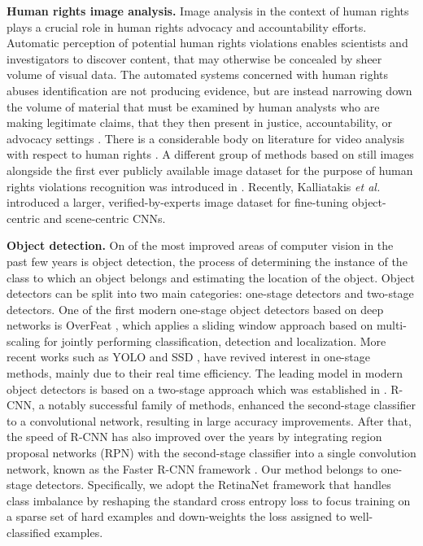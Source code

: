\documentclass[10pt,twocolumn,letterpaper]{article}
\begin{document}
\noindent
\textbf{Human rights image analysis.} Image analysis in the context of human rights plays a crucial role in human rights advocacy and accountability efforts. Automatic perception of potential human rights violations enables scientists and investigators to discover content, that may otherwise be concealed by sheer volume of visual data. The automated systems concerned with human rights abuses identification are not producing evidence, but are instead narrowing down the volume of material that must be examined by human analysts who are making legitimate claims, that they then present in justice, accountability, or advocacy settings \cite{aronson2018computer}. There is a considerable body on literature for video analysis with respect to human rights \cite{piracés_2018,aronson2015video}. A different group of methods based on still images alongside the first ever publicly available image dataset for the purpose of human rights violations recognition was introduced in \cite{visapp17}. Recently, Kalliatakis \textit{et al.} \cite{kalliatakis2019exploring} introduced a larger, verified-by-experts image dataset for fine-tuning object-centric and scene-centric CNNs.

\noindent
\textbf{Object detection.} On of the most improved areas of computer vision in the past few years is object detection, the process of determining the instance of the class to which an object belongs and estimating the location of the object. Object detectors can be split into two main categories: one-stage detectors and two-stage detectors. One of the first modern one-stage object detectors based on deep networks is OverFeat \cite{OverFeat}, which applies a sliding window approach based on multi-scaling for jointly performing classification, detection and localization. More recent works such as YOLO \cite{redmon2016you,redmon2016yolo9000} and SSD \cite{Fu2017DSSDD,liu2016ssd}, have revived interest in one-stage methods, mainly due to their real time efficiency. The leading model in modern object detectors is based on a two-stage approach which was established in \cite{uijlings2013selective}. R-CNN, a notably successful family of methods, \cite{girshick2015fast,girshick2014rich} enhanced the second-stage classifier to a convolutional network, resulting in large accuracy improvements. After that, the speed of R-CNN has also improved over the years by integrating region proposal networks (RPN) with the second-stage classifier into a single convolution network, known as the Faster R-CNN framework \cite{ren2015faster}. Our method belongs to one-stage detectors. Specifically, we adopt the RetinaNet framework \cite{lin2018focal} that handles class imbalance by reshaping the standard cross entropy loss to focus training on a sparse set of hard examples and down-weights the loss assigned to well-classified examples. 
\end{document}

